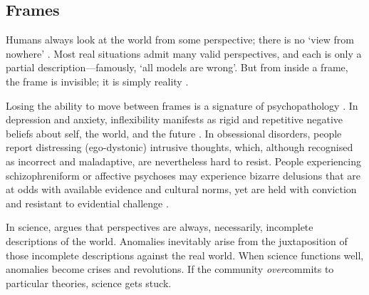 \documentclass[11pt]{article}
\begin{document}







\subsection{Frames} 

Humans always look at the world from some perspective; there is no `view from nowhere' \citep{nagel1986view}. Most real situations admit many valid perspectives, and each is only a partial description---famously, `all models are wrong'. But from inside a frame, the frame is invisible; it is simply reality \citep{goffman1974frame, berger1966social, kuhn1970structure, wittgenstein1953philosophical}. 

Losing the ability to move between frames is a signature of psychopathology \citep{kashdan2010psychological}. In depression and anxiety, inflexibility manifests as rigid and repetitive negative beliefs about self, the world, and the future \citep{beck2011cognitive}. In obsessional disorders, people report distressing (ego-dystonic) intrusive thoughts, which, although recognised as incorrect and maladaptive, are nevertheless hard to resist. People experiencing schizophreniform or affective psychoses may experience bizarre delusions that are at odds with available evidence and cultural norms, yet are held with conviction and resistant to evidential challenge \citep{adams2013computational}. 

In science, \cite{kuhn1970structure} argues that perspectives are always, necessarily, incomplete descriptions of the world. Anomalies inevitably arise from the juxtaposition of those incomplete descriptions against the real world. When science functions well, anomalies become crises and revolutions. If the community \textit{over}commits to particular theories, science gets stuck.
\end{document}
